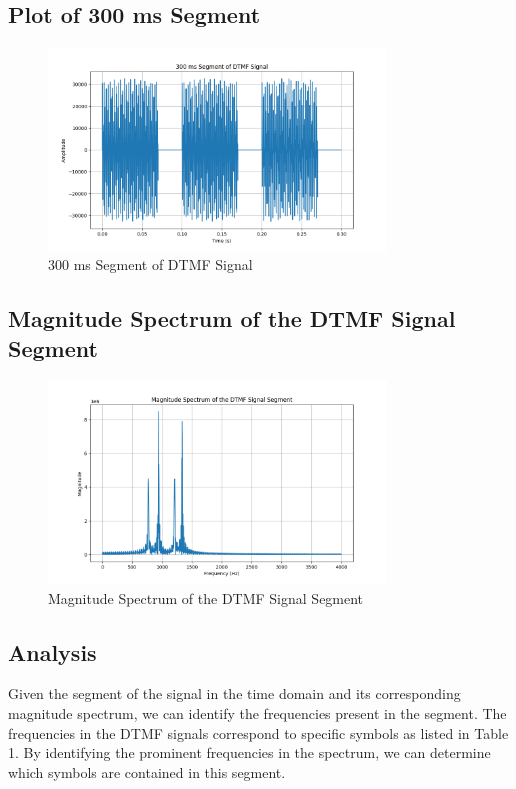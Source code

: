 \subsection*{Plot of 300 ms Segment}
\begin{figure}[h]
    \centering
    \includegraphics[width=0.8\textwidth]{fig/ex4_a_dtmf_segment.png}
    \caption{300 ms Segment of DTMF Signal}
    \label{fig:ex4_a_dtmf_segment}
\end{figure}

\subsection*{Magnitude Spectrum of the DTMF Signal Segment}
\begin{figure}[h]
    \centering
    \includegraphics[width=0.8\textwidth]{fig/ex4_a_dtmf_spectrum.png}
    \caption{Magnitude Spectrum of the DTMF Signal Segment}
    \label{fig:ex4_a_dtmf_spectrum}
\end{figure}

\subsection*{Analysis}
Given the segment of the signal in the time domain and its corresponding magnitude spectrum, we can identify the frequencies present in the segment. The frequencies in the DTMF signals correspond to specific symbols as listed in Table 1. By identifying the prominent frequencies in the spectrum, we can determine which symbols are contained in this segment.
